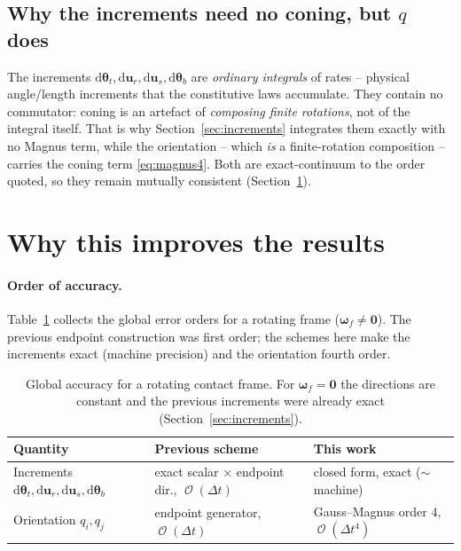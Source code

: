 \documentclass[11pt]{article}
\newcommand{\bwf}{\boldsymbol{\omega}_f}
\newcommand{\Dt}{\Delta t}
\DeclareMathOperator{\Oo}{\mathcal{O}}
\begin{document}
\subsection{Why the increments need no coning, but $q$ does}

The increments $\mathrm{d}\boldsymbol{\theta}_t,\mathrm{d}\mathbf u_r,\mathrm{d}\mathbf u_s,
\mathrm{d}\boldsymbol{\theta}_b$ are \emph{ordinary integrals} of rates -- physical
angle/length increments that the constitutive laws accumulate. They contain no
commutator: coning is an artefact of \emph{composing finite rotations}, not of the
integral itself. That is why Section~\ref{sec:increments} integrates them exactly with no
Magnus term, while the orientation -- which \emph{is} a finite-rotation composition --
carries the coning term \eqref{eq:magnus4}. Both are exact-continuum to the order quoted,
so they remain mutually consistent (Section~\ref{sec:why}).

\section{Why this improves the results}
\label{sec:why}

\paragraph{Order of accuracy.} Table~\ref{tab:orders} collects the global error orders for
a rotating frame ($\bwf\neq\mathbf0$). The previous endpoint construction was first order;
the schemes here make the increments exact (machine precision) and the orientation
fourth order.

\begin{table}[h]
\centering
\begin{tabular}{lll}
\toprule
Quantity & Previous scheme & This work\\
\midrule
Increments $\mathrm{d}\boldsymbol\theta_t,\mathrm{d}\mathbf u_r,\mathrm{d}\mathbf u_s,\mathrm{d}\boldsymbol\theta_b$
  & exact scalar $\times$ endpoint dir., $\Oo(\Dt)$ & closed form, exact ($\sim$\,machine)\\
Orientation $q_i,q_j$
  & endpoint generator, $\Oo(\Dt)$ & Gauss--Magnus order 4, $\Oo(\Dt^4)$\\
\bottomrule
\end{tabular}
\caption{Global accuracy for a rotating contact frame. For $\bwf=\mathbf0$ the directions
are constant and the previous increments were already exact (Section~\ref{sec:increments}).}
\label{tab:orders}
\end{table}
\end{document}
